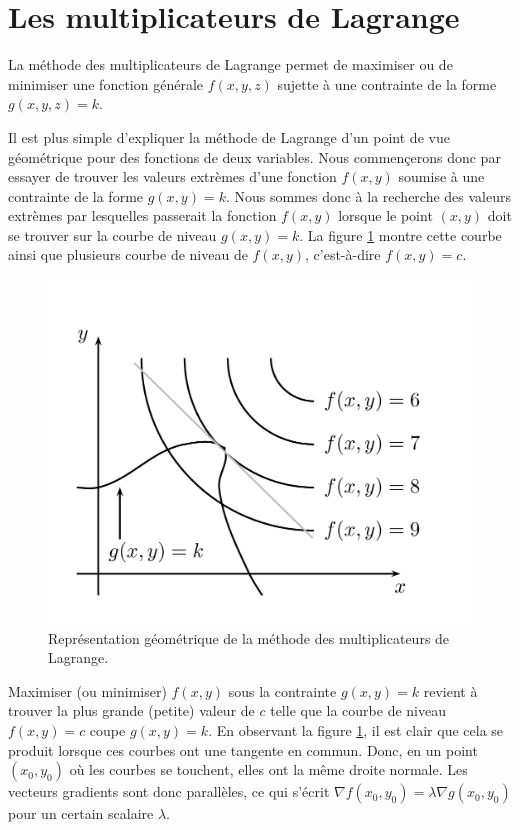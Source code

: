 \documentclass[]{book}
\theoremstyle{definition}
\theoremstyle{definition}
\theoremstyle{definition}
\theoremstyle{remark}
\begin{document}
\hypertarget{les-multiplicateurs-de-lagrange}{%
\section{Les multiplicateurs de
Lagrange}\label{les-multiplicateurs-de-lagrange}}

La méthode des multiplicateurs de Lagrange permet de maximiser ou de
minimiser une fonction générale \(f(x,y,z)\) sujette à une contrainte de
la forme \(g(x,y,z)=k\).

Il est plus simple d'expliquer la méthode de Lagrange d'un point de vue
géométrique pour des fonctions de deux variables. Nous commençerons donc
par essayer de trouver les valeurs extrèmes d'une fonction \(f(x,y)\)
soumise à une contrainte de la forme \(g(x,y)=k\). Nous sommes donc à la
recherche des valeurs extrèmes par lesquelles passerait la fonction
\(f(x,y)\) lorsque le point \((x,y)\) doit se trouver sur la courbe de
niveau \(g(x,y)=k\). La figure \ref{fig:multiplicateur-lagrange} montre
cette courbe ainsi que plusieurs courbe de niveau de \(f(x,y)\),
c'est-à-dire \(f(x,y)=c\).

\begin{figure}

{\centering \includegraphics[width=0.9\linewidth]{resources/images/latex/lagrange} 

}

\caption{Représentation géométrique de la méthode des multiplicateurs de Lagrange.}\label{fig:multiplicateur-lagrange}
\end{figure}

Maximiser (ou minimiser) \(f(x,y)\) sous la contrainte \(g(x,y)=k\)
revient à trouver la plus grande (petite) valeur de \(c\) telle que la
courbe de niveau \(f(x,y)=c\) coupe \(g(x,y)=k\). En observant la figure
\ref{fig:multiplicateur-lagrange}, il est clair que cela se produit
lorsque ces courbes ont une tangente en commun. Donc, en un point
\((x_0,y_0)\) où les courbes se touchent, elles ont la même droite
normale. Les vecteurs gradients sont donc parallèles, ce qui s'écrit
\(\nabla f(x_0,y_0)=\lambda \nabla g(x_0,y_0)\) pour un certain scalaire
\(\lambda\).
\end{document}
